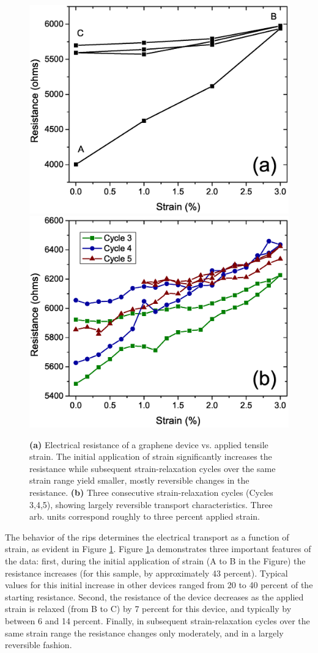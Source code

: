 \documentclass[edeposit,fullpage,draftthesis]{uiucthesis2009}
\begin{document}
        \begin{figure}
        \centering
        \includegraphics[width=0.49\linewidth]{images/resultsanddiscussion/rippingpaper/Fig2a.eps}
        \includegraphics[width=0.49\linewidth]{images/resultsanddiscussion/rippingpaper/Fig2b.eps}
            \caption[Resistance vs strain for graphene on flexible substrates]{
                \textbf{(a)} Electrical resistance of a graphene device vs. applied tensile strain. 
                The initial application of strain significantly increases the resistance while subsequent 
                strain-relaxation cycles over the same strain range yield smaller, mostly reversible 
                changes in the resistance. \textbf{(b)} Three consecutive strain-relaxation cycles 
                (Cycles 3,4,5), showing largely reversible transport characteristics. Three arb. units 
                correspond roughly to three percent applied strain.}
        \label{fig:rip-RvsStrain}
        \end{figure}
   
        The behavior of the rips determines the electrical transport as a function of
        strain, as evident in Figure \ref{fig:rip-RvsStrain}. Figure \ref{fig:rip-RvsStrain}a 
        demonstrates three important features
        of the data: first, during the initial application of strain (A to B in the
        Figure) the resistance increases (for this sample, by approximately 43
        percent). Typical values for this initial increase in other devices ranged from
        20 to 40 percent of the starting resistance. Second, the resistance of the
        device decreases as the applied strain is relaxed (from B to C) by 7 percent
        for this device, and typically by between 6 and 14 percent. Finally, in
        subsequent strain-relaxation cycles over the same strain range the resistance
        changes only moderately, and in a largely reversible fashion.
        
\end{document}
